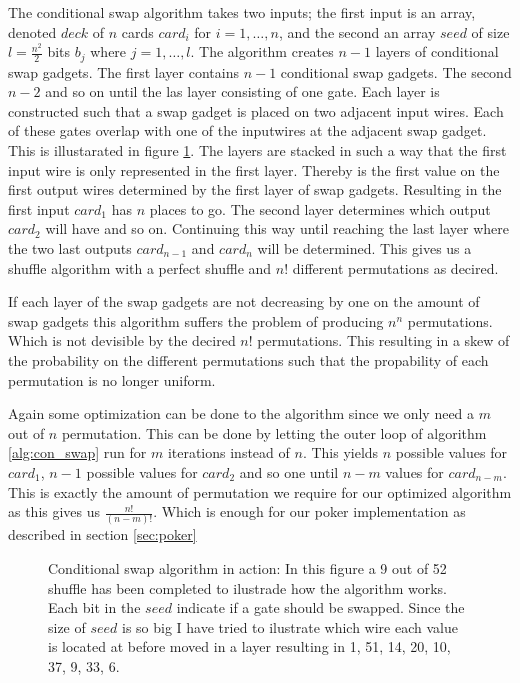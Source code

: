 \documentclass[twoside,11pt,openright]{report}
\begin{document}
The conditional swap algorithm takes two inputs; the first input is an array, denoted $deck$ of $n$ cards $card_i$ for $i=1,\dots,n$, and the second an array $seed$ of size $l=\frac{n^2}{2}$ bits $b_j$ where $j=1,\dots, l$. The algorithm creates $n-1$ layers of conditional swap gadgets. The first layer contains $n-1$ conditional swap gadgets. The second $n-2$ and so on until the las layer consisting of one gate. Each layer is constructed such that a swap gadget is placed on two adjacent input wires. Each of these gates overlap with one of the inputwires at the adjacent swap gadget. This is illustarated in figure \ref{fig:con_swap}. The layers are stacked in such a way that the first input wire is only represented in the first layer. Thereby is the first value on the first output wires determined by the first layer of swap gadgets. Resulting in the first input $card_1$ has $n$ places to go. The second layer determines which output $card_2$ will have and so on. Continuing this way until reaching the last layer where the two last outputs $card_{n-1}$ and $card_n$ will be determined. This gives us a shuffle algorithm with a perfect shuffle and $n!$ different permutations as decired.

If each layer of the swap gadgets are not decreasing by one on the amount of swap gadgets this algorithm suffers the problem of producing $n^n$ permutations. Which is not devisible by the decired $n!$ permutations. This resulting in a skew of the probability on the different permutations such that the propability of each permutation is no longer uniform.

\bigskip

Again some optimization can be done to the algorithm since we only need a $m$ out of $n$ permutation. This can be done by letting the outer loop of algorithm \ref{alg:con_swap} run for $m$ iterations instead of $n$. This yields $n$ possible values for $card_1$, $n-1$ possible values for $card_2$ and so one until $n-m$ values for $card_{n-m}$. This is exactly the amount of permutation we require for our optimized algorithm as this gives us $\frac{n!}{(n-m)!}$. Which is enough for our poker implementation as described in section \ref{sec:poker}

\bigskip

\begin{figure}
\centering
\scalebox{1.5}{}
\caption{Conditional swap algorithm in action: In this figure a 9 out of 52 shuffle has been completed to ilustrade how the algorithm works. Each bit in the $seed$ indicate if a gate should be swapped. Since the size of $seed$ is so big I have tried to ilustrate which wire each value is located at before moved in a layer resulting in 1, 51, 14, 20, 10, 37, 9, 33, 6.}
\label{fig:con_swap}
\end{figure}
\end{document}
